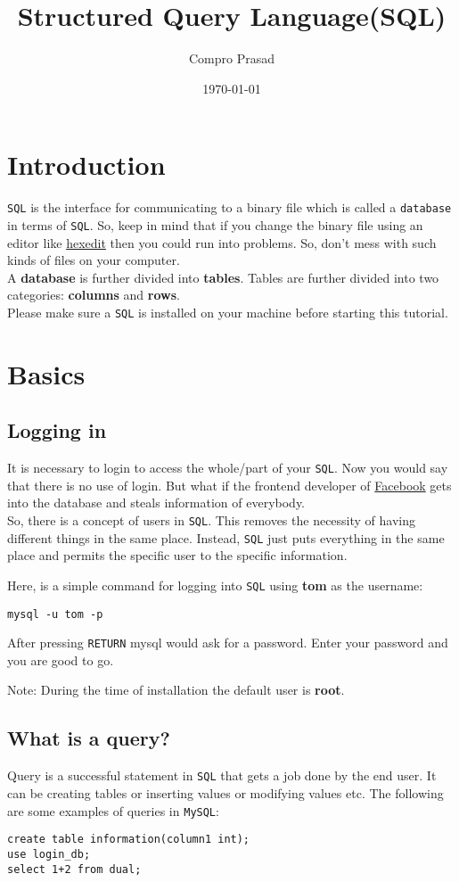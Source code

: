 \documentclass[11pt]{article}
\author{Compro Prasad}
\date{\today}
\title{Structured Query Language(SQL)}
\begin{document}
\maketitle
\tableofcontents

\section{Introduction}
\label{sec:orgheadline1}
\texttt{SQL} is the interface for communicating to a binary file
which is called a \texttt{database} in terms of \texttt{SQL}. So, keep in
mind that if you change the binary file using an editor like
\href{http://hexedit.com/}{hexedit} then you could run into problems. So, don't mess
with such kinds of files on your computer.\\
A \textbf{database} is further divided into \textbf{tables}. Tables are further
divided into two categories: \textbf{columns} and \textbf{rows}.\\
Please make sure a \texttt{SQL} is installed on your machine before
starting this tutorial.
\section{Basics}
\label{sec:orgheadline10}
\subsection{Logging in}
\label{sec:orgheadline2}
It is necessary to login to access the whole/part of your
\texttt{SQL}. Now you would say that there is no use of login. But
what if the frontend developer of \href{https://facebook.com}{Facebook} gets into the
database and steals information of everybody.\\
So, there is a concept of users in \texttt{SQL}. This removes the
necessity of having different things in the same place.
Instead, \texttt{SQL} just puts everything in the same place and
permits the specific user to the specific information.

Here, is a simple command for logging into \texttt{SQL} using
\textbf{tom} as the username:
\begin{verbatim}
mysql -u tom -p
\end{verbatim}
After pressing \texttt{RETURN} mysql would ask for a password.
Enter your password and you are good to go.

Note: During the time of installation the default user is \textbf{root}.
\subsection{What is a query?}
\label{sec:orgheadline3}
Query is a successful statement in \texttt{SQL} that gets a job done
by the end user. It can be creating tables or inserting values
or modifying values etc. The following are some examples of
queries in \texttt{MySQL}:
\begin{verbatim}
create table information(column1 int);
use login_db;
select 1+2 from dual;
\end{verbatim}
\end{document}
